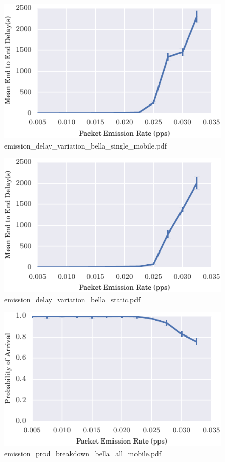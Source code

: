 \documentclass{article}
\begin{document}
\begin{figure}[h!]
\centering
\includegraphics[width=\linewidth]{emission_delay_variation_bella_single_mobile.pdf}
\caption{emission\_delay\_variation\_bella\_single\_mobile.pdf}
\end{figure}




\begin{figure}[h!]
\centering
\includegraphics[width=\linewidth]{emission_delay_variation_bella_static.pdf}
\caption{emission\_delay\_variation\_bella\_static.pdf}
\end{figure}




\begin{figure}[h!]
\centering
\includegraphics[width=\linewidth]{emission_prod_breakdown_bella_all_mobile.pdf}
\caption{emission\_prod\_breakdown\_bella\_all\_mobile.pdf}
\end{figure}
\end{document}
